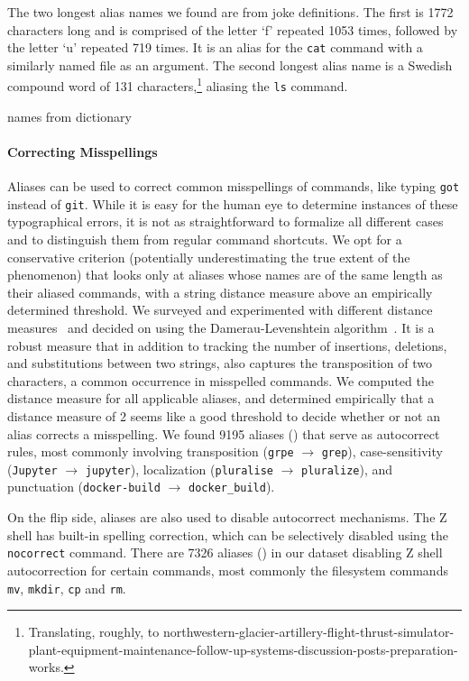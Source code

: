 The two longest alias names we found are from joke definitions.
The first is \num{1772} characters long and is comprised of the letter `f' repeated \num{1053} times, followed by the letter `u' repeated 719 times.
It is an alias for the \verb|cat| command with a similarly named file as an argument.
The second longest alias name is a Swedish compound word of \num{131} characters,\footnote{Translating, roughly, to northwestern-glacier-artillery-flight-thrust-simulator-plant-equipment-maintenance-follow-up-systems-discussion-posts-preparation-works.} aliasing the \verb|ls| command.

\TODO names from dictionary

\paragraph{\bf Correcting Misspellings}

Aliases can be used to correct common misspellings of commands, like typing \verb|got| instead of \verb|git|.
While it is easy for the human eye to determine instances of these typographical errors, it is not as straightforward to formalize all different cases and to distinguish them from regular command shortcuts.
We opt for a conservative criterion (potentially underestimating the true extent of the phenomenon) that looks only at aliases whose names are of the same length as their aliased commands, with a string distance measure above an empirically determined threshold.
We surveyed and experimented with different distance measures~\cite{navarro:01} and decided on using the Damerau-Levenshtein algorithm~\cite{damerau:64}.
It is a robust measure that in addition to tracking the number of insertions, deletions, and substitutions between two strings, also captures the transposition of two characters, a common occurrence in misspelled commands.
We computed the distance measure for all applicable aliases, and determined empirically that a distance measure of 2 seems like a good threshold to decide whether or not an alias corrects a misspelling.
We found \num{9195} aliases () that serve as autocorrect rules, most commonly involving transposition (\verb|grpe| $\rightarrow$ \verb|grep|), case-sensitivity (\verb|Jupyter| $\rightarrow$ \verb|jupyter|), localization (\verb|pluralise| $\rightarrow$ \verb|pluralize|), and punctuation (\verb|docker-build| $\rightarrow$ \verb|docker_build|).

On the flip side, aliases are also used to disable autocorrect mechanisms.
The Z shell has built-in spelling correction, which can be selectively disabled using the \verb|nocorrect| command.
There are \num{7326} aliases () in our dataset disabling Z shell autocorrection for certain commands, most commonly the filesystem commands \verb|mv|, \verb|mkdir|, \verb|cp| and \verb|rm|.

